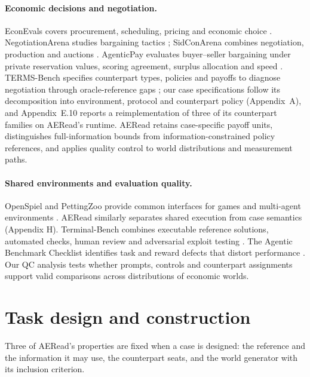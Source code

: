 \paragraph{Economic decisions and negotiation.}
EconEvals covers procurement, scheduling, pricing and economic choice
\citep{fish2025econevals}. NegotiationArena studies bargaining tactics
\citep{bianchi2024negotiationarena}; SidConArena combines negotiation,
production and auctions \citep{feng2026sidconarena}. AgenticPay evaluates
buyer--seller bargaining under private reservation values, scoring
agreement, surplus allocation and speed \citep{liu2026agenticpay}.
TERMS-Bench specifies counterpart types, policies and payoffs to diagnose
negotiation through oracle-reference gaps \citep{zhang2026termsbench}; our
case specifications follow its decomposition into environment, protocol
and counterpart policy (Appendix~A), and Appendix~E.10 reports a
reimplementation of three of its counterpart families on AERead's runtime.
AERead retains case-specific payoff units, distinguishes full-information
bounds from information-constrained policy references, and applies quality control to world
distributions and measurement paths.

\paragraph{Shared environments and evaluation quality.}
OpenSpiel and PettingZoo provide common interfaces for games and
multi-agent environments \citep{lanctot2019openspiel,terry2021pettingzoo}.
AERead similarly separates shared execution from case semantics
(Appendix H). Terminal-Bench combines executable reference solutions,
automated checks, human review and adversarial exploit testing
\citep{merrill2026terminalbench}. The Agentic Benchmark Checklist
identifies task and reward defects that distort performance
\citep{zhu2025abc}. Our QC analysis tests whether prompts, controls and
counterpart assignments support valid comparisons across distributions
of economic worlds.

\section{Task design and construction}
\label{sec:task-design}

Three of AERead's properties are fixed when a case is designed: the
reference and the information it may use, the counterpart seats, and the
world generator with its inclusion criterion.

